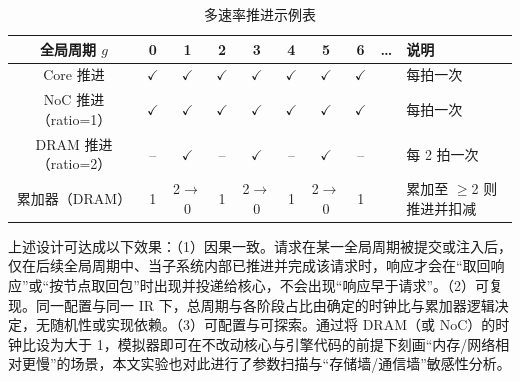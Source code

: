 \begin{table}[htbp]
  \centering
  \caption{多速率推进示例表}
  \label{tab:c4_cdc_timeline}
  \small
  \begin{tabular*}{\textwidth}{@{\extracolsep{\fill}}cccccccccl}
    \toprule
    全局周期 $g$ & 0 & 1 & 2 & 3 & 4 & 5 & 6 & \ldots & 说明 \\
    \midrule
    Core 推进 & $\checkmark$ & $\checkmark$ & $\checkmark$ & $\checkmark$ & $\checkmark$ & $\checkmark$ & $\checkmark$ & & 每拍一次 \\
    NoC 推进（ratio=1） & $\checkmark$ & $\checkmark$ & $\checkmark$ & $\checkmark$ & $\checkmark$ & $\checkmark$ & $\checkmark$ & & 每拍一次 \\
    DRAM 推进（ratio=2） & -- & $\checkmark$ & -- & $\checkmark$ & -- & $\checkmark$ & -- & & 每 2 拍一次 \\
    累加器（DRAM） & 1 & 2$\to$0 & 1 & 2$\to$0 & 1 & 2$\to$0 & 1 & & 累加至 $\ge$2 则推进并扣减 \\
    \bottomrule
  \end{tabular*}
\end{table}

上述设计可达成以下效果：（1）因果一致。请求在某一全局周期被提交或注入后，仅在后续全局周期中、当子系统内部已推进并完成该请求时，响应才会在“取回响应”或“按节点取回包”时出现并投递给核心，不会出现“响应早于请求”。（2）可复现。同一配置与同一 IR 下，总周期与各阶段占比由确定的时钟比与累加器逻辑决定，无随机性或实现依赖。（3）可配置与可探索。通过将 DRAM（或 NoC）的时钟比设为大于 1，模拟器即可在不改动核心与引擎代码的前提下刻画“内存/网络相对更慢”的场景，本文实验也对此进行了参数扫描与“存储墙/通信墙”敏感性分析。






